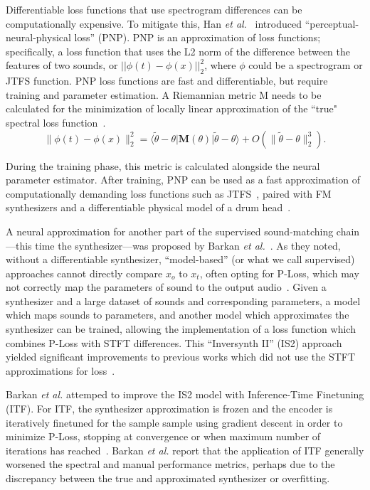 Differentiable loss functions that use spectrogram differences can be computationally expensive. To mitigate this, Han \textit{et al.}~\cite{han2023perceptual} introduced ``perceptual-neural-physical loss'' (PNP). PNP is an approximation of loss functions; specifically, a loss function that uses the L2 norm of the difference between the features of two sounds, or $||\phi(t) - \phi(x)||^2_2$, where $\phi$ could be a spectrogram or JTFS function. PNP loss functions are fast and differentiable, but require training and parameter estimation. A Riemannian metric M needs to be calculated for the minimization of locally linear approximation of the ``true" spectral loss function~\cite{han2023perceptual}. 
\[
\|\phi(t) - \phi(x)\|_2^2 = \langle \tilde{\theta} - \theta | \mathbf{M}(\theta) | \tilde{\theta} - \theta \rangle + O(\|\tilde{\theta} - \theta\|_2^3). \tag{4}
\]

During the training phase, this metric is calculated alongside the neural parameter estimator. After training, PNP can be used as a fast approximation of computationally demanding loss functions such as JTFS~\cite{han2023perceptual,han2024learning}, paired with FM synthesizers and a differentiable physical model of a drum head~\cite{smith2010physical}.

A neural approximation for another part of the supervised sound-matching chain---this time the synthesizer---was proposed by Barkan \textit{et al.}~\cite{barkan2023inversynthII}. As they noted, without a differentiable synthesizer, ``model-based'' (or what we call supervised) approaches cannot directly compare $x_o$ to $x_t$, often opting for P-Loss, which may not correctly map the parameters of sound to the output audio~\cite{esling2019flow,han2023perceptual,masuda2023improving}. Given a synthesizer and a large dataset of sounds and corresponding parameters, a model which maps sounds to parameters, and another model which approximates the synthesizer can be trained, allowing the implementation of a loss function which combines P-Loss with STFT differences. This ``Inversynth II'' (IS2) approach yielded significant improvements to previous works which did not use the STFT approximations for loss~\cite{esling2019flow,barkan2019inversynth}.

Barkan \textit{et al.} attemped to  improve the IS2 model with Inference-Time
Finetuning (ITF). For ITF, the synthesizer approximation is frozen and the encoder is iteratively finetuned for the sample sample using gradient descent in order to minimize P-Loss, stopping at convergence or when maximum number of iterations has reached~\cite{barkan2023inversynthII}. Barkan \textit{et al.} report that the application of ITF generally worsened the spectral and manual performance metrics, perhaps due to the discrepancy between the true and approximated synthesizer or overfitting.


